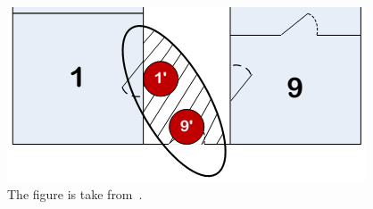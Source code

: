 \begin{figure}%
\centering
\includegraphics[width=0.8\columnwidth]{images/speed2.png}%
\caption{The figure is take from~\cite{Jensen:2009:GMB:1590953.1591000}.}%
\label{fig:speed2}%
\end{figure}






